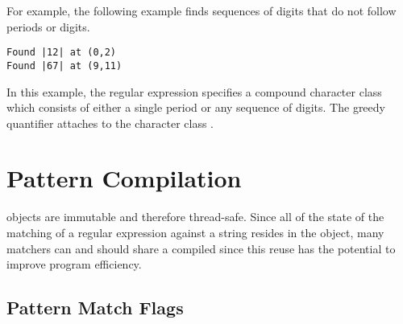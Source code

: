 For example, the following example finds sequences of digits that do
not follow periods or digits.
%
\begin{verbatim} 
Found |12| at (0,2)
Found |67| at (9,11)
\end{verbatim}
%
In this example, the regular expression specifies a compound character class
which consists of either a single period or any sequence of digits.
The greedy quantifier \code{+} attaches to the character class .

\section{Pattern Compilation}\label{section:pattern-compile}

 objects are immutable and therefore thread-safe.
Since all of the state of the matching of a regular expression
against a string resides in the  object,
many matchers can and should share a compiled 
since this reuse has the potential to improve program efficiency.

\subsection{Pattern Match Flags}\label{section:pattern-modes}

